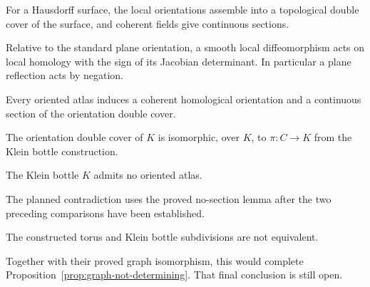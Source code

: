 \begin{proposition}\label{prop:orientation-cover}
  \notready
  For a Hausdorff surface, the local orientations assemble into a topological
  double cover of the surface, and coherent fields give continuous sections.
\end{proposition}

\begin{lemma}\label{lem:jacobian-homology}
  \notready
  Relative to the standard plane orientation, a smooth local diffeomorphism
  acts on local homology with the sign of its Jacobian determinant.
  In particular a plane reflection acts by negation.
\end{lemma}

\begin{proposition}\label{prop:atlas-gives-section}
  \notready
  Every oriented atlas induces a coherent homological orientation and a
  continuous section of the orientation double cover.
\end{proposition}

\begin{proposition}\label{prop:klein-orientation-cover}
  \notready
  The orientation double cover of $K$ is isomorphic, over $K$, to
  $\pi:C\to K$ from the Klein bottle construction.
\end{proposition}

\begin{proposition}\label{prop:klein-nonorientable}
  \notready
  The Klein bottle $K$ admits no oriented atlas.
\end{proposition}
The planned contradiction uses the proved no-section lemma after the two
preceding comparisons have been established.

\begin{proposition}\label{prop:torus-klein-nonequivalent}
  \notready
  The constructed torus and Klein bottle subdivisions are not equivalent.
\end{proposition}
Together with their proved graph isomorphism, this would complete
Proposition~\ref{prop:graph-not-determining}. That final conclusion is still open.
